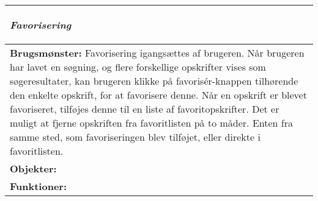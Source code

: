\begin{tabular}{p{\textwidth}}
    \hline
    \begin{center} 
    \textbf{\textit{Favorisering}} 
    \end{center} \\ \hline
    \textbf{Brugsmønster:} Favorisering igangsættes af brugeren. Når brugeren har lavet en søgning, og flere forskellige opskrifter vises som søgeresultater, kan brugeren klikke på favorisér-knappen tilhørende den enkelte opskrift, for at favorisere denne. Når en opskrift er blevet favoriseret, tilføjes denne til en liste af favoritopskrifter. Det er muligt at fjerne opskriften fra favoritlisten på to måder. Enten fra samme sted, som favoriseringen blev tilføjet, eller direkte i favoritlisten. \\
    \textbf{Objekter:}  \\
    \textbf{Funktioner:}  \\ \hline
\end{tabular}